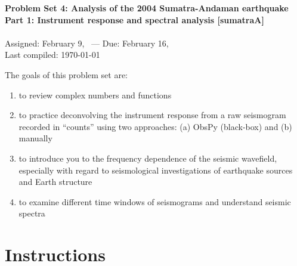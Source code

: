 \documentclass[11pt,titlepage,fleqn]{article}
\begin{document}

\begin{spacing}{1.2}
\centering
{\large \bf Problem Set 4: Analysis of the 2004 Sumatra-Andaman earthquake \\
Part 1: Instrument response and spectral analysis [sumatraA] \\ }
\cltag\ \\
Assigned: February 9, \cyear\ --- Due: February 16, \cyear\ \\
Last compiled: \today
\end{spacing}


\bigskip
\noindent
The goals of this problem set are:
%
\begin{enumerate}
\item to review complex numbers and functions
\item to practice deconvolving the instrument response from a raw seismogram recorded in ``counts'' using two approaches: (a) ObsPy (black-box) and (b) manually
\item to introduce you to the frequency dependence of the seismic wavefield, especially with regard to seismological investigations of earthquake sources and Earth structure
\item to examine different time windows of seismograms and understand seismic spectra
\end{enumerate}

\section*{Instructions}
\end{document}

